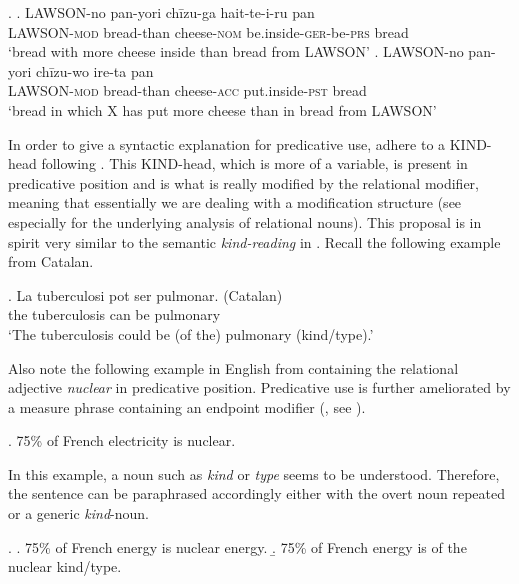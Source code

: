 \ex. \ag. LAWSON-no pan-yori chīzu-ga hait-te-i-ru pan\\
LAWSON-\textsc{mod} bread-than cheese-\textsc{nom} be.inside-\textsc{ger}-be-\textsc{prs} bread\\
`bread with more cheese inside than bread from LAWSON’
\bg. LAWSON-no pan-yori chīzu-wo ire-ta pan\\
LAWSON-\textsc{mod} bread-than cheese-\textsc{acc} put.inside-\textsc{pst} bread\\
`bread in which X has put more cheese than in bread from LAWSON’

In order to give a syntactic explanation for predicative use, \citet{shimada:2018:relational} adhere to a KIND-head following \citet{adger:2013:syntax}. This KIND-head, which is more of a variable, is present in predicative position and is what is really modified by the relational modifier, meaning that essentially we are dealing with a modification structure (see especially \citealt[§ 4]{adger:2013:syntax} for the underlying analysis of relational nouns). This proposal is in spirit very similar to the semantic \textit{kind-reading} in \citet{mcnally:2004:relational}. Recall the following example from Catalan.  

\exg. La tuberculosi pot ser pulmonar. (Catalan)\\
the tuberculosis can be pulmonary\\
`The tuberculosis could be (of the) pulmonary (kind/type).’ \\ \null \hfill \citep[189]{mcnally:2004:relational}

Also note the following example in  English from \citet{bauer:2013:oxford} containing the relational adjective \textit{nuclear} in predicative position. Predicative use is further ameliorated by a measure phrase containing an endpoint modifier (\citealt{fabregas:2014:adjectival}, see \citealt[80]{shimada:2018:relational}).

\ex. 75\% of French electricity is nuclear. \hfill \citep[318]{bauer:2013:oxford}

In this example, a noun such as \textit{kind} or \textit{type} seems to be understood. Therefore, the sentence can be paraphrased accordingly either with the overt noun repeated or a generic \textit{kind}-noun. 

\ex. \a. 75\% of French energy is nuclear energy.
\b. 75\% of French energy is of the nuclear kind/type.

